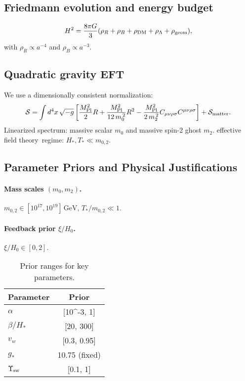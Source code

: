 \documentclass[preprint,aps,prd,onecolumn,nofootinbib,longbibliography]{revtex4-2}
\newcommand{\EFT}{effective field theory}
\numberwithin{equation}{section}
\begin{document}
\subsection{Friedmann evolution and energy budget}
\label{sec:fried}
\begin{equation}
H^2=\frac{8\pi G}{3}(\rho_R+\rho_B+\rho_{\mathrm{DM}}+\rho_\Lambda+\rho_{\rm geom}),
\end{equation}
with $\rho_R\!\propto\!a^{-4}$ and $\rho_B\!\propto\!a^{-3}$.

\subsection{Quadratic gravity EFT}
\label{sec:spool}
We use a dimensionally consistent normalization:
\begin{equation}
\mathcal S=\int d^4x\,\sqrt{-g}\left[\frac{M_{\rm Pl}^2}{2}R+\frac{M_{\rm Pl}^2}{12\,m_0^{\,2}}R^2-\frac{M_{\rm Pl}^2}{2\,m_2^{\,2}}C_{\mu\nu\rho\sigma}C^{\mu\nu\rho\sigma}\right]+\mathcal S_{\rm matter}.
\end{equation}
Linearized spectrum: massive scalar \(m_0\) and massive spin-2 ghost \(m_2\). \EFT\ regime: \(H_*,T_*\ll m_{0,2}\).

\subsection{Parameter Priors and Physical Justifications}
\label{sec:priors}
\paragraph{Mass scales $(m_0,m_2)$.} $m_{0,2}\in [10^{17},10^{19}]\,\mathrm{GeV}$, $T_*/m_{0,2}\!\ll\!1$.
\paragraph{Feedback prior $\xi/H_0$.} $\xi/H_0\in[0,2]$.

\begin{table}[h]
\centering
\caption{Prior ranges for key parameters.}
\begin{tabular}{lc}
\toprule
Parameter & Prior \\
\midrule
$\alpha$ & [10^{-3}, 1] \\
$\beta/H_*$ & [20, 300] \\
$v_w$ & [0.3, 0.95] \\
$g_*$ & 10.75 (fixed) \\
$\Upsilon_{\rm sw}$ & [0.1, 1] \\
\bottomrule
\end{tabular}
\label{tab:priors}
\end{table}
\end{document}

